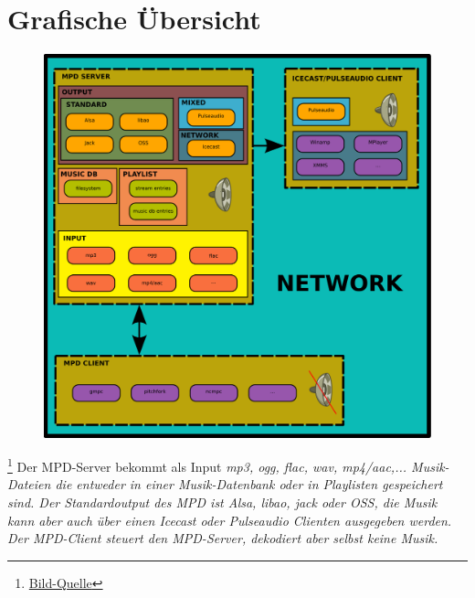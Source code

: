 \section{Grafische Übersicht}
\begin{figure}[h]
    \centering
    \includegraphics[scale=0.5]{./gfx/misc/Mpd-overview.png}
\end{figure}
\footnote{\href{http://images.wikia.com/mpd/images/6/68/Mpd-overview.png}{ Bild-Quelle}}
Der MPD-Server bekommt als Input \it mp3, ogg, flac, wav, mp4/aac,\rm ... Musik-Dateien die entweder in einer
Musik-Datenbank oder in Playlisten gespeichert sind. Der Standardoutput des MPD ist Alsa, libao, jack 
oder OSS, die Musik kann aber auch über einen Icecast oder Pulseaudio Clienten ausgegeben werden.
Der MPD-Client steuert den MPD-Server, dekodiert aber selbst keine Musik.
